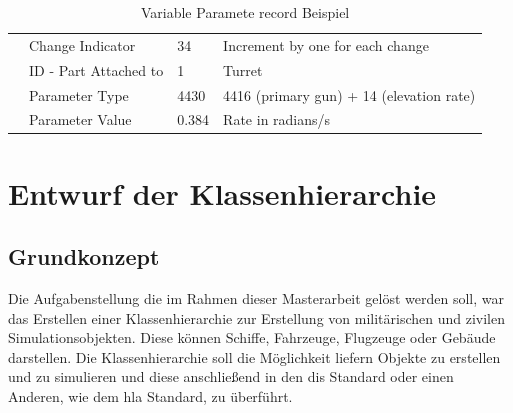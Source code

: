\begin{table}[H]
{\begin{tabular}{|l|l|l|l|}
			& Change Indicator      & 34             & Increment by one for each change         \\ \cline{2-4} 
			& ID - Part Attached to & 1              & Turret                             \\ \cline{2-4} 
			& Parameter Type        & 4430           & 4416 (primary gun) + 14 (elevation rate) \\ \cline{2-4} 
			& Parameter Value       &0.384         & Rate in radians/s                        \\ \hline
	\end{tabular}}
	\caption[Variable Parameter record Beispiel ]{Variable Paramete record Beispiel\cite{SISOStandardsActivityCommitteeoftheIEEEComputerSociety.}}
	\label{variableex}
\end{table}

\cite{SISOStandardsActivityCommitteeoftheIEEEComputerSociety.}
\cite{Shanks.}
\chapter{Entwurf der Klassenhierarchie }


\section{Grundkonzept}
Die Aufgabenstellung die im Rahmen dieser Masterarbeit gelöst werden soll, war das Erstellen einer Klassenhierarchie zur Erstellung von militärischen und zivilen Simulationsobjekten. Diese können Schiffe, Fahrzeuge, Flugzeuge oder Gebäude darstellen. Die Klassenhierarchie soll die Möglichkeit liefern Objekte zu erstellen und zu simulieren und  diese anschließend in  den \ac{dis} Standard oder einen Anderen,  wie dem \ac{hla} Standard, zu überführt.   
 
